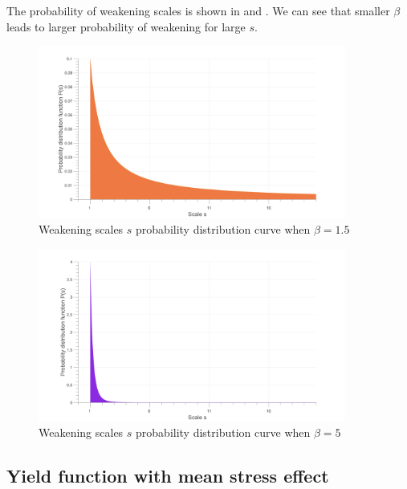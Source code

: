 The probability of weakening scales is shown in  and . We can see that smaller $\beta$ leads to larger probability of weakening for large $s$.
\begin{figure}[!h]
\centering
\includegraphics[width=0.9\textwidth]{figures//ps1.png} 
\caption{Weakening scales $s$ probability distribution curve when $\beta=1.5$ }
\label{ps1}
\end{figure}
\begin{figure}[!h]
\centering
\includegraphics[width=0.9\textwidth]{figures//ps2.png} 
\caption{Weakening scales $s$ probability distribution curve when $\beta=5$ }
\label{ps2}
\end{figure}

\subsection{Yield function with mean stress effect}

